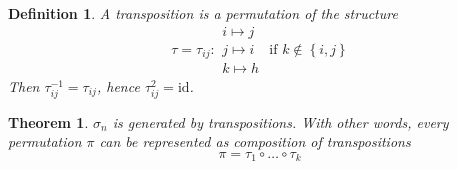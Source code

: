 \documentclass[a4paper,landscape,twocolumn]{article}
\newcommand\set[1]{\left\{#1\right\}}
\newtheorem{theorem}{Theorem}
\newtheorem{defi}{Definition}
\begin{document}
\begin{defi}
  A \emph{transposition} is a permutation of the structure
  \[
    \tau = \tau_{ij}:
    \begin{array}{c}
      i \mapsto j \\
      j \mapsto i \\
      k \mapsto h
    \end{array}
    \text{ if } k \notin \set{i,j}
  \]
  Then $\tau_{ij}^{-1} = \tau_{ij}$, hence $\tau_{ij}^2 = \text{id}$.
\end{defi}
\begin{theorem}
  \label{theorem-7.13}
  $\sigma_n$ is generated by transpositions.
  With other words, every permutation $\pi$ can be represented as composition of transpositions
  \[ \pi = \tau_1 \circ \ldots \circ \tau_k \]
\end{theorem}
\end{document}
